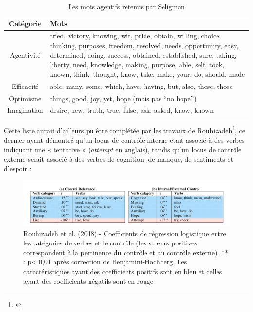 \begin{table}[ht]
\centering
\bigskip
\renewcommand{\arraystretch}{1.5} %
\begin{tabular}{|c|p{10cm}|}
    \hline
    Catégorie & Mots \\
    \hline
    Agentivité & tried, victory, knowing, wit, pride, obtain, willing, choice, thinking, purposes, freedom, resolved, needs, opportunity, easy, determined, doing, success, obtained, established, sure, taking, liberty, need, knowledge, making, purpose, able, self, took, known, think, thought, know, take, make, your, do, should, made \\
    \hline
    Efficacité & able, many, some, which, have, having, but, also, these, those \\
    Optimisme & things, good, joy, yet, hope (mais pas “no hope”) \\
    Imagination & desire, new, truth, true, false, ask, asked, know, known \\
    \hline
\end{tabular}
\caption{Les mots agentifs retenus par Seligman}
 \label{Tab:dico_seligman}
\end{table}
\newpage

\bigskip

Cette liste aurait d'ailleurs pu être complétée par les travaux de Rouhizadeh\footnote{\cite{rouhizadeh_identifying_2018}}, ce dernier ayant démontré qu'un locus de contrôle interne était associé à des verbes indiquant une « tentative » (\textit{attempt} en anglais), tandis qu'un locus de contrôle externe serait associé à des verbes de cognition, de manque, de sentiments et d'espoir : 

\begin{figure}[H]
\centering
    \includegraphics[width=16cm]{img/verbs_locus.png}
    \setlength{\abovecaptionskip}{-2pt} %
    \caption{Rouhizadeh et al. (2018) - Coefficients de régression logistique entre les catégories de verbes et le contrôle (les valeurs positives correspondent à la pertinence du contrôle et au contrôle externe). ** : p< 0,01 après correction de Benjamini-Hochberg. Les caractéristiques ayant des coefficients positifs sont en bleu et celles ayant des coefficients négatifs sont en rouge}
    \label{verbs_locus}
\end{figure}

